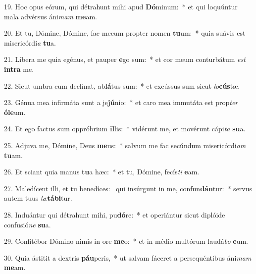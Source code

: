 19. Hoc opus eórum, qui détrahunt mihi apud \textbf{Dó}minum:~*  et qui loquúntur mala advérsus áni\textit{mam} \textbf{me}am.\

20. Et tu, Dómine, Dómine, fac mecum propter nomen \textbf{tu}um:~*  quia suávis est misericórdi\textit{a} \textbf{tu}a.\

21. Líbera me quia egénus, et pauper \textbf{e}go sum:~*  et cor meum conturbátum \textit{est} \textbf{in}\textbf{tra} me.\

22. Sicut umbra cum declínat, ab\textbf{lá}tus sum:~*  et excússus sum sicut \textit{lo}\textbf{cús}tæ.\

23. Génua mea infirmáta sunt a je\textbf{jú}nio:~*  et caro mea immutáta est prop\textit{ter} \textbf{ó}\textbf{le}um.\

24. Et ego factus sum oppróbrium \textbf{il}lis:~*  vidérunt me, et movérunt cápi\textit{ta} \textbf{su}a.\

25. Adjuva me, Dómine, Deus \textbf{me}us:~*  salvum me fac secúndum misericórdi\textit{am} \textbf{tu}am.\

26. Et sciant quia manus \textbf{tu}a hæc:~*  et tu, Dómine, fecís\textit{ti} \textbf{e}am.\

27. Maledícent illi, et tu benedíces: \dag\  qui insúrgunt in me, confun\textbf{dán}tur:~*  servus autem tuus \textit{læ}\textbf{tá}\textbf{bi}tur.\

28. Induántur qui détrahunt mihi, pu\textbf{dó}re:~*  et operiántur sicut diplóide confusió\textit{ne} \textbf{su}a.\

29. Confitébor Dómino nimis in ore \textbf{me}o:~*  et in médio multórum laudá\textit{bo} \textbf{e}um.\

30. Quia ástitit a dextris \textbf{páu}peris,~*  ut salvam fáceret a persequéntibus áni\textit{mam} \textbf{me}am.\


